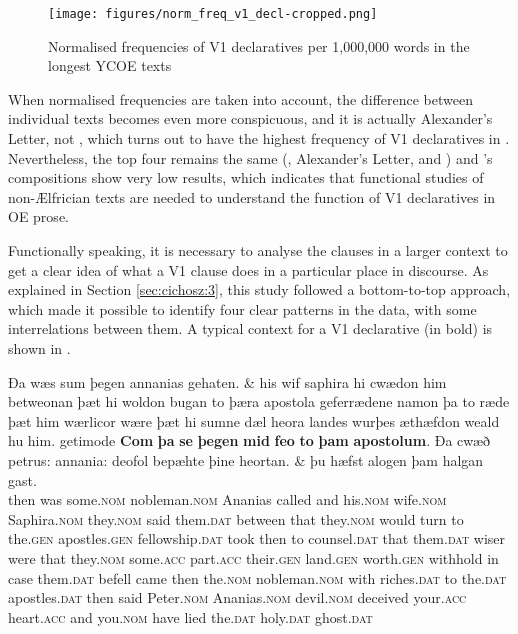 \documentclass[output=paper,colorlinks,citecolor=brown]{langscibook}
\begin{document}
\begin{figure}[t]
    \centering
    \texttt{[image: figures/norm\_freq\_v1\_decl-cropped.png]}
\caption{Normalised frequencies of V1 declaratives per 1,000,000 words in the longest YCOE texts}
\label{fig:cichosz:1}
\end{figure}

When normalised frequencies are taken into account, the difference between individual texts becomes even more conspicuous, and it is actually Alexander's Letter, not , which turns out to have the highest frequency of V1 declaratives in . Nevertheless, the top four remains the same (, Alexander's Letter,  and ) and 's compositions show very low results, which indicates that functional studies of non-Ælfrician texts are needed to understand the function of V1 declaratives in OE prose.

Functionally speaking, it is necessary to analyse the clauses in a larger context to get a clear idea of what a V1 clause does in a particular place in discourse. As explained in Section \ref{sec:cichosz:3}, this study followed a bottom-to-top approach, which made it possible to identify four clear patterns in the data, with some interrelations between them. A typical context for a V1 declarative (in bold) is shown in .

\ea
\label{ex:cichosz:7} 
\gll Ða wæs sum þegen annanias gehaten. \& his wif saphira hi cwædon him betweonan þæt hi woldon bugan to þæra apostola geferrædene namon þa to ræde þæt him wærlicor wære þæt hi sumne dæl heora landes wurþes æthæfdon weald hu him. getimode \textbf{Com} \textbf{þa} \textbf{se} \textbf{þegen} \textbf{mid} \textbf{feo} \textbf{to} \textbf{þam} \textbf{apostolum}. Ða cwæð petrus: annania: deofol bepæhte þine heortan. \& þu hæfst alogen þam halgan gast.\\
then was some.\textsc{nom} nobleman.\textsc{nom} Ananias called and his.\textsc{nom} wife.\textsc{nom} Saphira.\textsc{nom} they.\textsc{nom} said them.\textsc{dat} between that they.\textsc{nom} would turn to the.\textsc{gen} apostles.\textsc{gen} fellowship.\textsc{dat} took then to counsel.\textsc{dat} that them.\textsc{dat} wiser were that they.\textsc{nom} some.\textsc{acc} part.\textsc{acc} their.\textsc{gen} land.\textsc{gen} worth.\textsc{gen} withhold in case them.\textsc{dat} befell came then the.\textsc{nom} nobleman.\textsc{nom} with riches.\textsc{dat} to the.\textsc{dat} apostles.\textsc{dat} then said Peter.\textsc{nom} Ananias.\textsc{nom} devil.\textsc{nom} deceived your.\textsc{acc} heart.\textsc{acc} and you.\textsc{nom} have lied the.\textsc{dat} holy.\textsc{dat} ghost.\textsc{dat}\\
\end{document}
